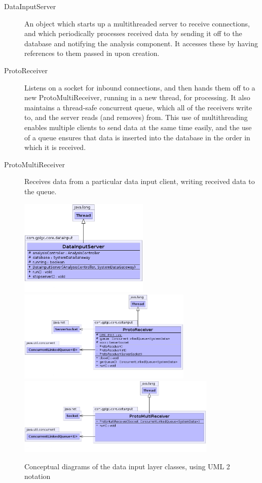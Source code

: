 \documentclass[10pt,a4paper]{article}
\begin{document}
\begin{description}
  \item[DataInputServer] An object which starts up a multithreaded
    server to receive connections, and which periodically processes
    received data by sending it off to the database and notifying the
    analysis component. It accesses these by having references to them
    passed in upon creation.

  \item[ProtoReceiver] Listens on a socket for inbound connections,
    and then hands them off to a new ProtoMultiReceiver, running in a
    new thread, for processing. It also maintains a thread-safe
    concurrent queue, which all of the receivers write to, and the
    server reads (and removes) from. This use of multithreading
    enables multiple clients to send data at the same time easily, and
    the use of a queue ensures that data is inserted into the database
    in the order in which it is received.

  \item[ProtoMultiReceiver] Receives data from a particular data input
    client, writing received data to the queue.
\end{description}

\begin{figure}[ht!]
  \centering
  \includegraphics[width=6.2cm]{images/DataInputLayer/DataInputServer.png}
  \includegraphics[width=8.3cm]{images/DataInputLayer/ProtoReceiver.png}
  \includegraphics[width=9.5cm]{images/DataInputLayer/ProtoMultiReceiver.png}
  \caption{Conceptual diagrams of the data input layer classes, using 
UML 2 notation}
  \label{fig:dataInputLayer}
\end{figure}
\end{document}
